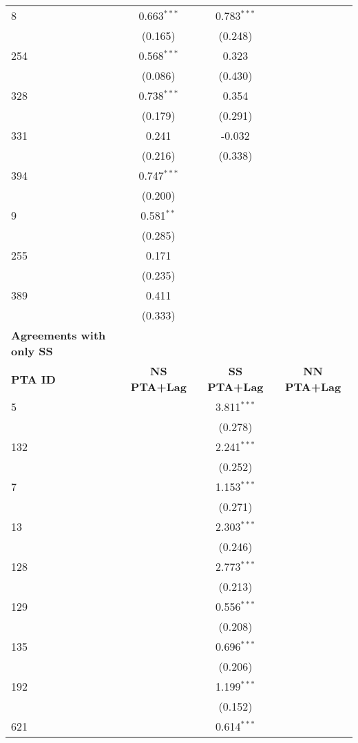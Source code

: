 \begin{center}
\begin{longtable}{lccc}
    8 & 0.663$^{\ast\ast\ast}$ & 0.783$^{\ast\ast\ast}$ &  \\
    & (0.165) & (0.248) &  \\
    254 & 0.568$^{\ast\ast\ast}$ & 0.323 &  \\
    & (0.086) & (0.430) &  \\
    328 & 0.738$^{\ast\ast\ast}$ & 0.354 &  \\
    & (0.179) & (0.291) &  \\
    331 & 0.241 & -0.032 &  \\
    & (0.216) & (0.338) &  \\
    394 & 0.747$^{\ast\ast\ast}$ &  &  \\
    & (0.200) &  &  \\
    9 & 0.581$^{\ast\ast}$ &  &  \\
    & (0.285) &  &  \\
    255 & 0.171 &  &  \\
    & (0.235) &  &  \\
    389 & 0.411 &  &  \\
    & (0.333) &  &  \\
    \hline
    \textbf{Agreements with only SS} &  &  &  \\
    \hline
    \textbf{PTA ID} & \textbf{NS PTA+Lag} & \textbf{SS PTA+Lag} & \textbf{NN PTA+Lag} \\
    \hline
    5   &  & 3.811$^{\ast\ast\ast}$ &  \\
    &  & (0.278) &  \\
    132 &  & 2.241$^{\ast\ast\ast}$ &  \\
    &  & (0.252) &  \\
    7   &  & 1.153$^{\ast\ast\ast}$ &  \\
    &  & (0.271) &  \\
    13  &  & 2.303$^{\ast\ast\ast}$ &  \\
    &  & (0.246) &  \\
    128 &  & 2.773$^{\ast\ast\ast}$ &  \\
    &  & (0.213) &  \\
    129 &  & 0.556$^{\ast\ast\ast}$ &  \\
    &  & (0.208) &  \\
    135 &  & 0.696$^{\ast\ast\ast}$ &  \\
    &  & (0.206) &  \\
    192 &  & 1.199$^{\ast\ast\ast}$ &  \\
    &  & (0.152) &  \\
    621 &  & 0.614$^{\ast\ast\ast}$ &  \\

\end{longtable}
\end{center}
